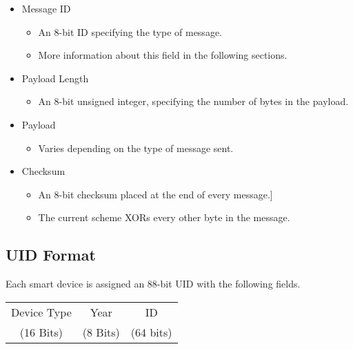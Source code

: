 \documentclass[12pt]{book}
\begin{document}
\begin{itemize}
	\item Message ID
	\begin{itemize}
		\item An 8-bit ID specifying the type of message.
		\item More information about this field in the following sections.
	\end{itemize}
	\item Payload Length
	\begin{itemize}
		\item An 8-bit unsigned integer, specifying the number of bytes in the payload.
	\end{itemize}
	\item Payload
	\begin{itemize}
		\item Varies depending on the type of message sent.
	\end{itemize}
	\item Checksum
	\begin{itemize}
		\item An 8-bit checksum placed at the end of every message.]
		\item The current scheme XORs every other byte in the message.
	\end{itemize}
\end{itemize}

\subsection{UID Format}
Each smart device is assigned an 88-bit UID with the following fields.

\begin{center}
	\begin{tabular}{|c|c|c|}
	\hline
	Device Type & Year & ID \\
	(16 Bits) & (8 Bits) & (64 bits) \\
	\hline
	\end{tabular}
\end{center}
\end{document}
